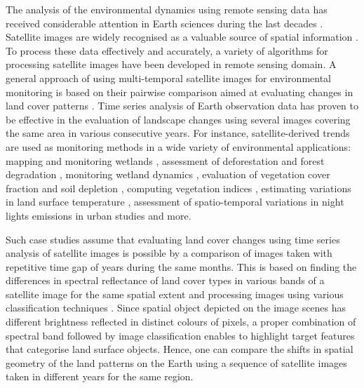 \documentclass[12pt,a4paper,oneside]{article}
\def \newpar{\vspace{6pt}}
\begin{document}
\newpar The analysis of the environmental dynamics using remote sensing data has received considerable attention in Earth sciences during the last decades \citep{SULTANA2023267,PAYRA2023239,MERTIKAS2021107}. Satellite images are widely recognised as a valuable source of spatial information \citep{Richards,Costel,Lerat}. To process these data effectively and accurately, a variety of algorithms for processing satellite images have been developed in remote sensing domain. A general approach of using multi-temporal satellite images for environmental monitoring is based on their pairwise comparison aimed at evaluating changes in land cover patterns \citep{OGILVIE2015368,Hiernaux}. Time series analysis of Earth observation data has proven to be effective in the evaluation of landscape changes using several images covering the same area in various consecutive years. For instance, satellite-derived trends are used as monitoring methods in a wide variety of environmental applications: mapping and monitoring wetlands \citep{WU2018140}, assessment of deforestation and forest degradation \citep{MASOLELE2021112600,rs11242999,ijgi11110573,rs9090905}, monitoring wetland dynamics \citep{KOVACS2022113267,land11122137}, evaluation of vegetation cover fraction and soil depletion \citep{DUBE2017112,rs15010020}, computing vegetation indices \citep{VENTER2020106206,app122412554,f13122066}, estimating variations in land surface temperature \citep{CARRILLONIQUETE2022104280}, assessment of spatio-temporal variations in night lights emissions in urban studies \citep{Rehman} and more. 

\newpar Such case studies assume that evaluating land cover changes using time series analysis of satellite images is possible by a comparison of images taken with repetitive time gap of years during the same months. This is based on finding the differences in spectral reflectance of land cover types in various bands of a satellite image for the same spatial extent and processing images using various classification techniques \citep{SHAHI202385,MERRY2023269,GANDHI201681}. Since spatial object depicted on the image scenes has different brightness reflected in distinct colours of pixels, a proper combination of spectral band followed by image classification enables to highlight target features that categorise land surface objects. Hence, one can compare the shifts in spatial geometry of the land patterns on the Earth using a sequence of satellite images taken in different years for the same region. 
\end{document}
